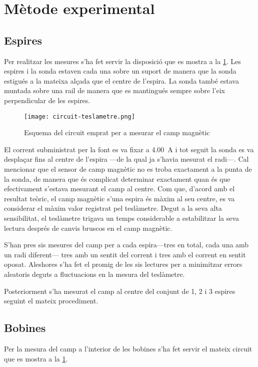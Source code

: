 \section{Mètode experimental}
\subsection{Espires}
Per realitzar les mesures s'ha fet servir la disposició que es mostra a la \cref{fig:circuit teslametre}. Les espires i la sonda estaven cada una sobre un suport de manera que la sonda estigués a la mateixa alçada que el centre de l'espira. La sonda també estava muntada sobre una rail de manera que es mantingués sempre sobre l'eix perpendicular de les espires.

\begin{figure}[htb]
  \centering \small \sffamily
  \texttt{[image: circuit-teslametre.png]}
  \caption{Esquema del circuit emprat per a mesurar el camp magnètic}
  \label{fig:circuit teslametre}
\end{figure}

El corrent subministrat per la font es va fixar a \SI{4.00}{A} i tot seguit la sonda es va desplaçar fins al centre de l'espira ---de la qual ja s'havia mesurat el radi---. Cal mencionar que el sensor de camp magnètic no es troba exactament a la punta de la sonda, de manera que és complicat determinar exactament quan és que efectivament s'estava mesurant el camp al centre. Com que, d'acord amb el resultat teòric, el camp magnètic s'una espira és màxim al seu centre, es va considerar el màxim valor registrat pel teslàmetre. Degut a la seva alta sensibilitat, el teslàmetre trigava un temps considerable a estabilitzar la seva lectura després de canvis bruscos en el camp magnètic. 

S'han pres sis mesures del camp per a cada espira---tres en total, cada una amb un radi diferent--- tres amb un sentit del corrent i tres amb el corrent en sentit oposat. Aleshores s'ha fet el promig de les sis lectures per a minimitzar errors aleatoris deguts a fluctuacions en la mesura del teslàmetre.   

Posteriorment s'ha mesurat el camp al centre del conjunt de 1, 2 i 3 espires seguint el mateix procediment.

\subsection{Bobines}
Per la mesura del camp a l'interior de les bobines s'ha fet servir el mateix circuit que es mostra a la \cref{fig:circuit teslametre}.

